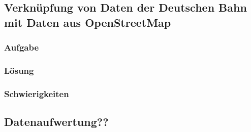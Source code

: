 \subsection{Verknüpfung von Daten der Deutschen Bahn mit Daten aus OpenStreetMap}
\subsubsection{Aufgabe}
\subsubsection{Lösung}
\subsubsection{Schwierigkeiten}
\subsection{Datenaufwertung??}
